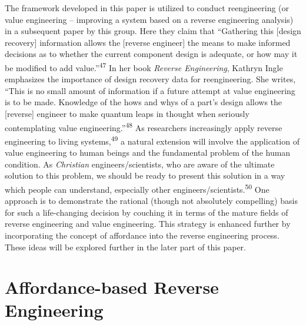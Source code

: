 The framework developed in this paper is utilized to conduct
reengineering (or value engineering – improving a system based on a
reverse engineering analysis) in a subsequent paper by this group. Here
they claim that “Gathering this [design recovery] information allows
the [reverse engineer] the means to make informed decisions as to
whether the current component design is adequate, or how may it be
modified to add value.”\textsuperscript{47} In her book \textit{Reverse
Engineering}, Kathryn Ingle emphasizes the importance of design
recovery data for reengineering. She writes, “This is no small amount
of information if a future attempt at value engineering is to be made.
Knowledge of the hows and whys of a part’s design allows the [reverse]
engineer to make quantum leaps in thought when seriously contemplating
value engineering.”\textsuperscript{48} As researchers increasingly
apply reverse engineering to living systems,\textsuperscript{49} a
natural extension will involve the application of value engineering to
human beings and the fundamental problem of the human condition. As
\textit{Christian} engineers/scientists, who are aware of the ultimate
solution to this problem, we should be ready to present this solution
in a way which people can understand, especially other
engineers/scientists.\textsuperscript{50} One approach is to
demonstrate the rational (though not absolutely compelling) basis for
such a life-changing decision by couching it in terms of the mature
fields of reverse engineering and value engineering. This strategy is
enhanced further by incorporating the concept of affordance into the
reverse engineering process. These ideas will be explored further in
the later part of this paper.

\section{Affordance-based Reverse Engineering}

